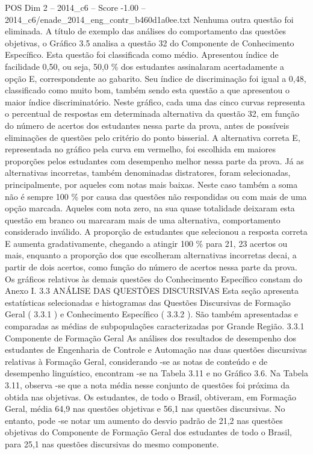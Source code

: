 \begin{textsample}{POS Dim 2 – 2014\_c6 – Score -1.00 – 2014\_c6/enade\_2014\_eng\_contr\_b460d1a0ee.txt}
Nenhuma outra questão foi eliminada.
A título de exemplo das análises do comportamento das questões objetivas, o Gráfico 3.5 analisa a questão 32 do Componente de Conhecimento Específico.
Esta questão foi classificada como médio.
Apresentou índice de facilidade 0,50, ou seja, 50,0 \% dos estudantes assinalaram acertadamente a opção E, correspondente ao gabarito.
Seu índice de discriminação foi igual a 0,48, classificado como muito bom, também sendo esta questão a que apresentou o maior índice discriminatório.
Neste gráfico, cada uma das cinco curvas representa o percentual de respostas em determinada alternativa da questão 32, em função do número de acertos dos estudantes nessa parte da prova, antes de possíveis eliminações de questões pelo critério do ponto bisserial.
A alternativa correta E, representada no gráfico pela curva em vermelho, foi escolhida em maiores proporções pelos estudantes com desempenho melhor nessa parte da prova.
Já as alternativas incorretas, também denominadas distratores, foram selecionadas, principalmente, por aqueles com notas mais baixas.
Neste caso também a soma não é sempre 100 \% por causa das questões não respondidas ou com mais de uma opção marcada.
Aqueles com nota zero, na sua quase totalidade deixaram esta questão em branco ou marcaram mais de uma alternativa, comportamento considerado inválido.
A proporção de estudantes que selecionou a resposta correta E aumenta gradativamente, chegando a atingir 100 \% para 21, 23 acertos ou mais, enquanto a proporção dos que escolheram alternativas incorretas decai, a partir de dois acertos, como função do número de acertos nessa parte da prova.
Os gráficos relativos às demais questões do Conhecimento Específico constam do Anexo I. 3.3 ANÁLISE DAS QUESTÕES DISCURSIVAS Esta seção apresenta estatísticas selecionadas e histogramas das Questões Discursivas de Formação Geral ( 3.3.1 ) e Conhecimento Específico ( 3.3.2 ).
São também apresentadas e comparadas as médias de subpopulações caracterizadas por Grande Região. 3.3.1 Componente de Formação Geral As análises dos resultados de desempenho dos estudantes de Engenharia de Controle e Automação nas duas questões discursivas relativas à Formação Geral, considerando -se as notas de conteúdo e de desempenho linguístico, encontram -se na Tabela 3.11 e no Gráfico 3.6.
Na Tabela 3.11, observa -se que a nota média nesse conjunto de questões foi próxima da obtida nas objetivas.
Os estudantes, de todo o Brasil, obtiveram, em Formação Geral, média 64,9 nas questões objetivas e 56,1 nas questões discursivas.
No entanto, pode -se notar um aumento do desvio padrão de 21,2 nas questões objetivas do Componente de Formação Geral dos estudantes de todo o Brasil, para 25,1 nas questões discursivas do mesmo componente.

\end{textsample}
